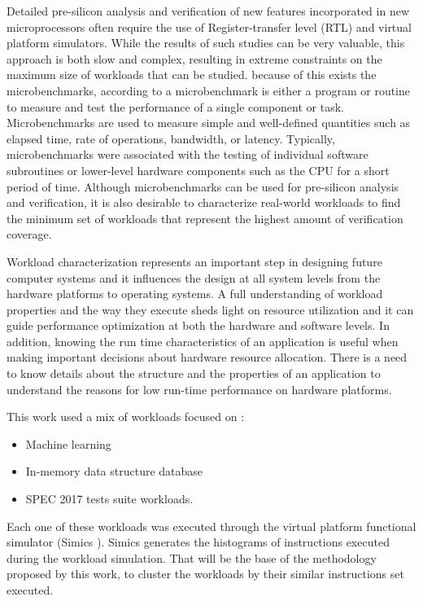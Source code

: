 \documentclass[]{PhDEngScITESO-R}
\begin{document}
Detailed pre-silicon analysis and verification of new features incorporated in new microprocessors often require the use of Register-transfer level (RTL) and virtual platform simulators. While the results of such studies can be very valuable, this approach is both slow and complex, resulting in extreme constraints on the maximum size of workloads that can be studied. because of this exists the microbenchmarks, according to \cite{Microbenchmark} a microbenchmark is either a program or routine to measure and test the performance of a single component or task. Microbenchmarks are used to measure simple and well-defined quantities such as elapsed time, rate of operations, bandwidth, or latency. Typically, microbenchmarks were associated with the testing of individual software subroutines or lower-level hardware components such as the CPU for a short period of time. Although microbenchmarks can be used for  pre-silicon analysis and verification, it is also desirable to characterize real-world workloads to find the minimum set of workloads that represent the highest amount of verification coverage.

Workload characterization represents an important step in designing future computer systems and it influences the design at all system levels from the hardware platforms to operating systems. A full understanding of workload properties and the way they execute sheds light on resource utilization and it can guide performance optimization at both the hardware and software levels. In addition, knowing the run time characteristics of an application is useful when making important decisions about hardware resource allocation. There is a need to know details about the structure and the properties of an application to understand the reasons for low run-time performance on hardware platforms. 

This work used a mix of workloads focused on : 
\begin{itemize}
\item Machine learning
\item In-memory data structure database
\item SPEC 2017 tests suite workloads.
\end{itemize}

 Each one of these workloads was executed through the virtual platform functional simulator (Simics \cite{Aarno}). Simics generates the histograms of instructions executed during the workload simulation. That will be the base of the methodology proposed by this work, to cluster the workloads by their similar instructions set executed. 
\end{document}
